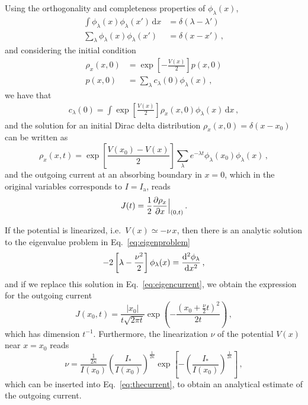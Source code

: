\begin{chapterappendices}
Using the orthogonality and completeness properties of $\phi_\lambda(x)$,
\begin{align}
    \int \phi_\lambda(x)\phi_\lambda(x')\,\mathrm{d}x &= \delta(\lambda - \lambda')\\
    \sum_\lambda \phi_\lambda(x)\phi_\lambda(x') &= \delta(x-x')\,,
\end{align}
and considering the initial condition
\begin{align}
    \rho_x(x,0) &= \exp\left[-\frac{V(x)}{2}\right] p(x,0) \\
    p(x,0) &= \sum_\lambda c_\lambda(0) \phi_\lambda(x)\,, \label{eq:mid_step_analytic}
\end{align}
we have that
\begin{align}
    c_\lambda(0) = \int \exp\left[\frac{V(x)}{2}\right] \rho_x(x,0)\phi_\lambda(x)\, \mathrm{d}x\,,
    \label{eq:c_lambda_zero}
\end{align}
and the solution for an initial Dirac delta distribution $\rho_x(x, 0)=\delta(x-x_0)$ can be written as
\begin{equation}
    \rho_x(x,t)=\exp\left[\frac{V(x_0)-V(x)}{2}\right]\sum_\lambda e^{-\lambda t}\phi_\lambda(x_0)\phi_\lambda(x)\, ,
\end{equation}
and the outgoing current at an absorbing boundary in $x=0$, which in the original variables corresponds to $I=I_\mathrm{a}$, reads
\begin{equation}
    J(t) = \frac{1}{2}\pdv{\rho_x}{x}\Bigr|_{(0,t)}     \, .
    \label{eq:eigencurrent}
\end{equation}

If the potential is linearized, i.e.\ $V(x)\simeq -\nu \, x$, then there is an analytic solution to the eigenvalue problem in Eq.~\eqref{eq:eigenproblem}
\begin{equation}
    -2\left[\lambda-\frac{\nu^2}{2}\right]\phi_\lambda(x)=\dv[2]{\phi_\lambda}{x}\, ,
\end{equation}
and if we replace this solution in Eq.~\eqref{eq:eigencurrent}, we obtain the expression for the outgoing current
\begin{equation}
    J(x_0, t) = \frac{|x_0|}{t\sqrt{2\pi t}}\exp\left(-\frac{(x_0+\frac{\nu}{2}t)^2}{2t}\right) \,,
    \label{eq:out_current}
\end{equation}
which has dimension $t^{-1}$. Furthermore, the linearization $\nu$ of the potential $V(x)$ near $x=x_0$ reads
\begin{equation}
    \nu=\frac{\frac{1}{2\kappa}}{I(x_0)}\left(\frac{I_\ast}{I(x_0)}\right)^{\frac{1}{2\kappa}}\exp\left[-\left(\frac{I_\ast}{I(x_0)}\right)^{\frac{1}{2\kappa}}\right]\,,
\end{equation}
which can be inserted into Eq.~\eqref{eq:thecurrent}, to obtain an analytical estimate of the outgoing current.


\end{chapterappendices}

